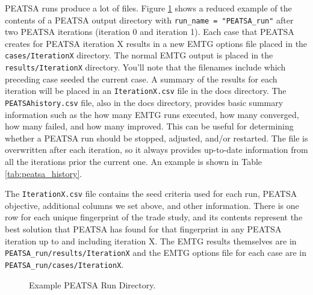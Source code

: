 \documentclass[11pt]{article}
\begin{document}
\ac{PEATSA} runs produce a lot of files. Figure \ref{fig:example_peatsa_run_dir} shows a reduced example of the contents of a \ac{PEATSA} output directory with \texttt{run\_name = "PEATSA\_run"} after two \ac{PEATSA} iterations (iteration 0 and iteration 1). Each case that \ac{PEATSA} creates for \ac{PEATSA} iteration X results in a new \ac{EMTG} options file placed in the \texttt{cases/IterationX} directory. The normal \ac{EMTG} output is placed in the \texttt{results/IterationX} directory. You’ll note that the filenames include which preceding case seeded the current case. A summary of the results for each iteration will be placed in an \texttt{IterationX.csv} file in the docs directory. The \texttt{PEATSAhistory.csv} file, also in the docs directory, provides basic summary information such as the how many \ac{EMTG} runs executed, how many converged, how many failed, and how many improved. This can be useful for determining whether a \ac{PEATSA} run should be stopped, adjusted, and/or restarted. The file is overwritten after each iteration, so it always provides up-to-date information from all the iterations prior the current one. An example is shown in Table \ref{tab:peatsa_history}.

\noindent The \texttt{IterationX.csv} file contains the seed criteria used for each run, \ac{PEATSA} objective, additional columns we set above, and other information. There is one row for each unique fingerprint of the trade study, and its contents represent the best solution that \ac{PEATSA} has found for that fingerprint in any \ac{PEATSA} iteration up to and including iteration X. The \ac{EMTG} results themselves are in \texttt{PEATSA\_run/results/IterationX} and the \ac{EMTG} options file for each case are in \texttt{PEATSA\_run/cases/IterationX}.

\begin{figure}[H]
	\centering
	\caption{\label{fig:example_peatsa_run_dir}Example \ac{PEATSA} Run Directory.}
\end{figure}
\end{document}
